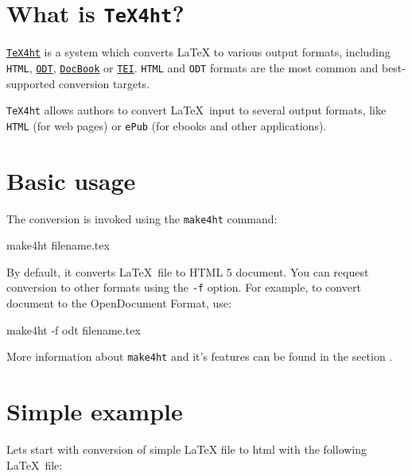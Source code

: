 \hypertarget{what-is-tex4ht}{%
\section{\texorpdfstring{What is
\texttt{TeX4ht}?}{What is TeX4ht?}}\label{what-is-tex4ht}}

\href{https://www.tug.org/tex4ht/}{\texttt{TeX4ht}} is a system which
converts LaTeX to various output formats, including \texttt{HTML},
\href{http://en.wikipedia.org/wiki/OpenDocument}{\texttt{ODT}},
\href{http://en.wikipedia.org/wiki/DocBook}{\texttt{DocBook}} or
\href{http://en.wikipedia.org/wiki/Text_Encoding_Initiative}{\texttt{TEI}}.
\texttt{HTML} and \texttt{ODT} formats are the most common and best-supported
conversion targets.

\texttt{TeX4ht} allows authors to convert \LaTeX\ input to 
several output formats, like  \texttt{HTML} (for web pages) or
\texttt{ePub} (for ebooks and other applications).

\hypertarget{basic-usage}{%
\section{Basic usage}\label{basic-usage}}

The conversion is invoked using the \texttt{make4ht} command:

\begin{shellcommand}
make4ht filename.tex
\end{shellcommand}

By default, it converts \LaTeX\ file to HTML 5 document. You can request
conversion to other formats using the \texttt{-f} option. For example,
to convert document to the OpenDocument Format, use:

\begin{shellcommand}
make4ht -f odt filename.tex
\end{shellcommand}

More information about \texttt{make4ht} and it's features can be found in the
section .



\hypertarget{simple-example}{%
\section{Simple example}\label{simple-example}}

Lets start with conversion of simple LaTeX file to html  
with the following \LaTeX\ file:

